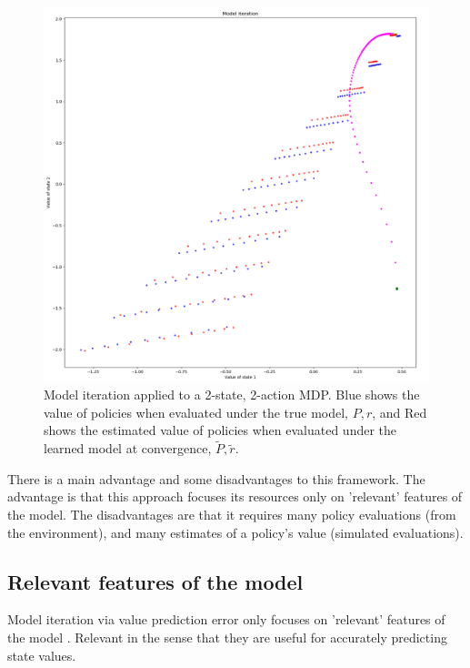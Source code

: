 \begin{figure}
\centering
\includegraphics[width=1.0\textwidth,height=0.8\textheight]{../../pictures/figures/model_iteration.png}
\caption{Model iteration applied to a 2-state, 2-action MDP.
Blue shows the value of policies when evaluated under the true model, $P, r$,
and Red shows the estimated value of policies when evaluated under the learned model at convergence, $\tilde P, \tilde r$.}
\end{figure}

There is a main advantage and some disadvantages to this framework.
The advantage is that this approach focuses its resources only on 'relevant' features of the model.
The disadvantages are that it requires many policy evaluations (from the environment),
and many estimates of a policy's value (simulated evaluations).

\subsection{Relevant features of the model}

Model iteration via value prediction error only focuses on 'relevant' features of the model \footnotemark[31].
Relevant in the sense that they are useful for accurately predicting state values.


